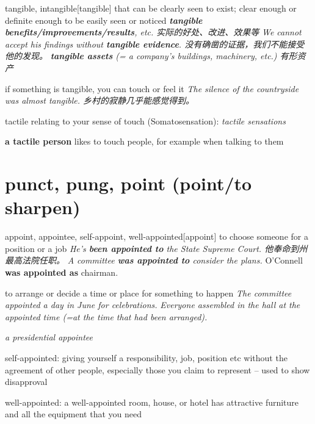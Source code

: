 \begin{DefWord}{tangible, intangible}[tangible]
    that can be clearly seen to exist; clear enough or definite enough to be easily seen or noticed
    \textit{\textbf{tangible benefits/improvements/results}, etc. 实际的好处、改进、效果等 }
    \textit{We cannot accept his findings without \textbf{tangible evidence}. 没有确凿的证据，我们不能接受他的发现。}
    \textit{\textbf{tangible assets} (= a company's buildings, machinery, etc.) 有形资产}

    if something is tangible, you can touch or feel it
    \textit{The silence of the countryside was almost tangible. 乡村的寂静几乎能感觉得到。}
\end{DefWord}



\begin{DefWord}{tactile}
    relating to your sense of touch (Somatosensation):
    \textit{tactile sensations}
    
    \textbf{a tactile person} likes to touch people, for example when talking to them

\end{DefWord}


\section{punct, pung, point (point/to sharpen)}

\begin{DefWord}{appoint, appointee, self-appoint, well-appointed}[appoint]
    to choose someone for a position or a job
    \textit{He's \textbf{been appointed to }the State Supreme Court. 他奉命到州最高法院任职。}
    \textit{A committee \textbf{was appointed to} consider the plans.}
    O'Connell \textbf{was appointed as} chairman.

    to arrange or decide a time or place for something to happen
    \textit{The committee appointed a day in June for celebrations.}
    \textit{Everyone assembled in the hall at the appointed time (=at the time that had been arranged).}

    \textit{a presidential appointee}

    self-appointed: giving yourself a responsibility, job, position etc without the agreement of other people, especially those you claim to represent – used to show disapproval

    well-appointed: a well-appointed room, house, or hotel has attractive furniture and all the equipment that you need
\end{DefWord}

